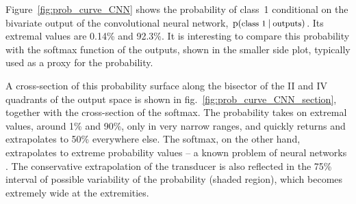 \documentclass[\ifafour a4paper,12pt,\else a5paper,10pt,\fi%
onecolumn,oneside,article,%
british%
]{memoir}
\theoremstyle{remark}
\theoremstyle{innote}
\newcommand*{\p}{\mathrm{p}}%
\renewcommand*{\|}[1][]{\nonscript\:#1\vert\nonscript\:\mathopen{}}
\newcommand*{\fig}{fig.}%
\newcommand*{\texts}[1]{\text{\small #1}}
\newcommand*{\CNN}{convolutional neural network}
\newcommand*{\cnn}{convolutional-neural-network}
\begin{document}
\begin{figure}[!t]
\parbox[b]{0.34\linewidth}{}
\end{figure}
%
Figure~\ref{fig:prob_curve_CNN} shows the probability of class~1 conditional on the bivariate output of the \CNN, $\p(\texts{class 1} \| \texts{outputs})$. Its extremal values are 0.14\% and 92.3\%. It is interesting to compare this probability with the softmax function of the outputs, shown in the smaller side plot, typically used as a proxy for the probability.

A cross-section of this probability surface along the bisector of the II and IV quadrants of the output space is shown in \fig~\ref{fig:prob_curve_CNN_section}, together with the cross-section of the softmax. The probability takes on extremal values, around 1\% and 90\%, only in very narrow ranges, and quickly returns and extrapolates to 50\% everywhere else. The softmax, on the other hand, extrapolates to extreme probability values -- a known problem of neural networks \autocites{galetal2016}. The conservative extrapolation of the transducer is also reflected in the 75\% interval of possible variability of the probability (shaded region), which becomes extremely wide at the extremities.
\end{document}
